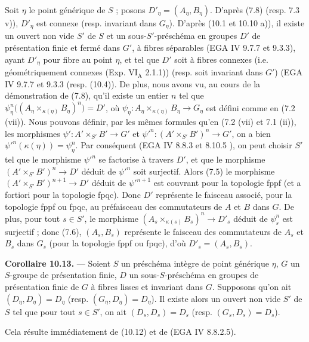 \documentclass[11pt,a4paper]{article}
\begin{document}
Soit $\eta$ le point générique de $S$ ; posons
$D'_{\eta} = (A_{\eta}, B_{\eta})$. D'après (7.8) (resp. 7.3 v)),
$D'_{\eta}$ est connexe (resp. invariant dans $G_{\eta}$). D'après (10.1
et 10.10 a)), il existe un ouvert non vide $S'$ de $S$ et un
sous-$S'$-préschéma en groupes $D'$ de présentation finie et fermé dans
$G'$, à fibres séparables (EGA IV 9.7.7 et 9.3.3), ayant $D'_{\eta}$ pour
fibre au point $\eta$, et tel que $D'$ soit à fibres connexes (i.e.
géométriquement connexes (Exp. VI$_{\mathrm{A}}$ 2.1.1)) (resp. soit
invariant dans $G'$) (EGA IV 9.7.7 et 9.3.3 (resp. (10.4)). De plus, nous
avons vu, au cours de la démonstration de (7.8), qu'il existe un entier
$n$ tel que
$\psi_{\eta}^{n}\bigl((A_{\eta} \times_{\kappa(\eta)} B_{\eta})^{n}\bigr)
= D'$, où
$\psi_{\eta} \colon A_{\eta} \times_{\kappa(\eta)} B_{\eta} \to G_{\eta}$
est défini comme en (7.2 (vii)). Nous pouvons définir, par les mêmes
formules qu'en (7.2 (vii) et 7.1 (ii)), les morphismes
$\psi' \colon A' \times_{S'} B' \to G'$ et
$\psi'^{n} \colon (A' \times_{S'} B')^{n} \to G'$, on a bien
$\psi'^{n}(\kappa(\eta)) = \psi_{\eta}^{n}$. Par conséquent (EGA IV 8.8.3
et 8.10.5 ), on peut choisir $S'$ tel que le morphisme
$\psi'^{n}$  se factorise à travers $D'$, et que le
morphisme $(A' \times_{S'} B')^{n} \to D'$ déduit de $\psi'^{n}$ soit
surjectif. Alors (7.5) le morphisme $(A' \times_{S'} B')^{n+1} \to D'$
déduit de $\psi'^{n+1}$ est couvrant pour la topologie fppf (et a fortiori
pour la topologie fpqc). Donc $D'$ représente le faisceau associé, pour la
topologie fppf ou fpqc, au préfaisceau des commutateurs de $A$ et $B$ dans
$G$. De plus, pour tout $s \in S'$, le morphisme
$(A_{s} \times_{\kappa(s)} B_{s})^{n} \to D'_{s}$ déduit de
$\psi_{s}^{n}$ est surjectif ; donc (7.6), $(A_{s}, B_{s})$ représente le
faisceau des commutateurs de $A_{s}$ et $B_{s}$ dans $G_{s}$ (pour la
topologie fppf ou fpqc), d'où $D'_{s} = (A_{s}, B_{s})$.

\textbf{Corollaire 10.13.} — Soient $S$ un préschéma intègre de point
générique $\eta$, $G$ un $S$-groupe de présentation finie, $D$ un
sous-$S$-préschéma en groupes de présentation finie de $G$ à fibres
lisses et invariant dans $G$. Supposons qu'on ait
$(D_{\eta}, D_{\eta}) = D_{\eta}$ (resp. $(G_{\eta}, D_{\eta}) = D_{\eta}$).
Il existe alors un ouvert non vide $S'$ de $S$ tel que pour tout
$s \in S'$, on ait $(D_{s}, D_{s}) = D_{s}$ (resp.
$(G_{s}, D_{s}) = D_{s}$).

Cela résulte immédiatement de (10.12) et de (EGA IV 8.8.2.5).
\end{document}
